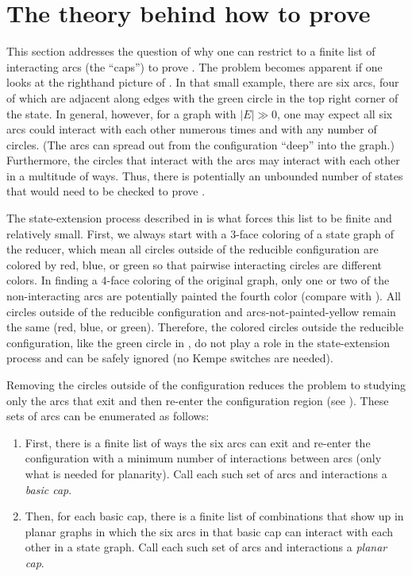 \documentclass[12pt]{amsart}
\theoremstyle{definition}
\theoremstyle{remark}
\numberwithin{equation}{section}
\begin{document}
\section{The theory behind how to prove }
\label{section:taking-the-cap-of-a-state}

This section addresses the question of why one can restrict to a finite list of interacting arcs (the ``caps'') to prove . The problem becomes apparent if one looks at the righthand picture of .  In that small example, there are six arcs, four of which are adjacent along  edges with the green circle in the top right corner of the state. In general, however, for a graph with $|E| \gg 0$, one may expect all six arcs could interact with each other numerous times and with any number of circles. (The arcs can  spread out from the configuration ``deep'' into the graph.) Furthermore, the circles that interact with the arcs may interact with each other in a multitude of ways. Thus, there is potentially an unbounded number of states that would need to be  checked to prove .

The state-extension process described in  is what forces this list to be finite and relatively small. First, we always start with a $3$-face coloring of a state graph of the reducer, which mean all circles outside of the reducible configuration are colored by red, blue, or green so that pairwise interacting circles are different colors. In finding a $4$-face coloring of the original graph, only one or two of the non-interacting arcs are potentially painted the fourth color (compare    with ). All circles  outside of the reducible configuration and arcs-not-painted-yellow remain the same  (red, blue, or green). Therefore, the colored circles outside the reducible configuration, like the green circle in , do not play a role in the state-extension process and can be safely ignored (no Kempe switches are needed). 

Removing the circles outside of the configuration reduces the problem to studying only the arcs that exit and then re-enter the configuration region (see ).  These sets of arcs can be enumerated as follows:
\begin{enumerate}
\item First, there is a finite list of ways the six arcs can exit and re-enter the configuration with a minimum number of interactions between arcs (only what is needed for planarity). Call each such set of arcs and interactions a {\em basic cap}.  
\item Then, for each basic cap, there is a finite list of combinations that show up in planar graphs in which the six arcs in that basic cap can interact with each other in a state graph. Call each such set of arcs and interactions a {\em planar cap}.
\end{enumerate}
\end{document}
